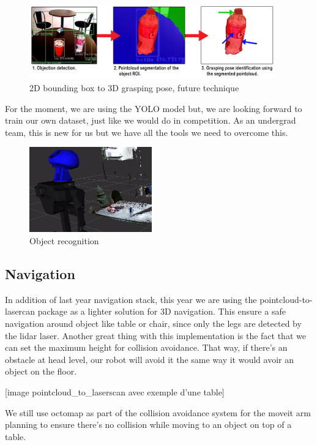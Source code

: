 \documentclass[runningheads,a4paper]{llncs}
\begin{document}
\begin{figure}
  \centering
  \includegraphics[width=300pt]{images/frame_to_box2.png}
  \caption{2D bounding box to 3D grasping pose, future technique}
\end{figure}


For the moment, we are using the YOLO model but, we are looking forward to train our own dataset, just like we would do in competition. As an undergrad team, this is new for us but we have all the tools we need to overcome this. \\

\ifdraft
\begin{figure}
  \centering
  \includegraphics[width=150pt]{images/objectreco.png}
  \caption{Object recognition}
\end{figure}
\fi

\subsection{Navigation}
\tab In addition of last year navigation stack, this year we are using the pointcloud-to-lasercan package as a lighter solution for 3D navigation. This ensure a safe navigation around object like table or chair, since only the legs are detected by the lidar laser. Another great thing with this implementation is the fact that we can set the maximum height for collision avoidance. That way, if there’s an obstacle at head level, our robot will avoid it the same way it would avoir an object on the floor.

[image pointcloud\_to\_laserscan avec exemple d’une table]

We still use octomap as part of the collision avoidance system for the moveit arm planning to ensure there’s no collision while moving to an object on top of a table.\\
\end{document}
